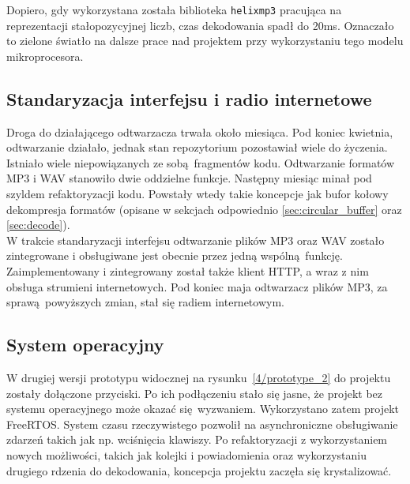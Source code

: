 \documentclass[polish]{aghengthesis}
\newcommand{\lstfile}[3]{
	\noindent
	\hspace{0.1\linewidth}
	\begin{minipage}{0.8\linewidth}
		
	\end{minipage}
	\vspace{0.3cm}
}
\begin{document}
			\lstfile{c}{Pomiar czasu dekodowania ramki MP3}{lst/4/benchmark.c}
			
			Dopiero, gdy wykorzystana została biblioteka \lstinline|helixmp3| pracująca na reprezentacji stałopozycyjnej liczb, czas dekodowania spadł do 20ms. Oznaczało to zielone światło na dalsze prace nad projektem przy wykorzystaniu tego modelu mikroprocesora.
			
		\subsection{Standaryzacja interfejsu i radio internetowe}
			Droga do działającego odtwarzacza trwała około miesiąca. Pod koniec kwietnia, odtwarzanie działało, jednak stan repozytorium pozostawiał wiele do życzenia. Istniało wiele niepowiązanych ze sobą fragmentów kodu. Odtwarzanie formatów MP3 i WAV stanowiło dwie oddzielne funkcje. Następny miesiąc minał pod szyldem refaktoryzacji kodu. Powstały wtedy takie koncepcje jak bufor kołowy dekompresja formatów (opisane w sekcjach odpowiednio \ref{sec:circular_buffer} oraz \ref{sec:decode}).
			$ $\\
			
			W trakcie standaryzacji interfejsu odtwarzanie plików MP3 oraz WAV zostało zintegrowane i obsługiwane jest obecnie przez jedną wspólną funkcję.
			Zaimplementowany i zintegrowany został także klient HTTP, a wraz z nim obsługa strumieni internetowych.
			Pod koniec maja odtwarzacz plików MP3, za sprawą powyższych zmian, stał się radiem internetowym.
			
		\subsection{System operacyjny}
			W drugiej wersji prototypu widocznej na rysunku~\ref{4/prototype_2} do projektu zostały dołączone przyciski.
			Po ich podłączeniu stało się jasne, że projekt bez systemu operacyjnego może okazać się wyzwaniem. Wykorzystano zatem projekt FreeRTOS. System czasu rzeczywistego pozwolił na asynchroniczne obsługiwanie zdarzeń takich jak np. wciśnięcia klawiszy. Po refaktoryzacji z wykorzystaniem nowych możliwości, takich jak kolejki i powiadomienia oraz wykorzystaniu drugiego rdzenia do dekodowania, koncepcja projektu zaczęła się krystalizować.
			
\end{document}
